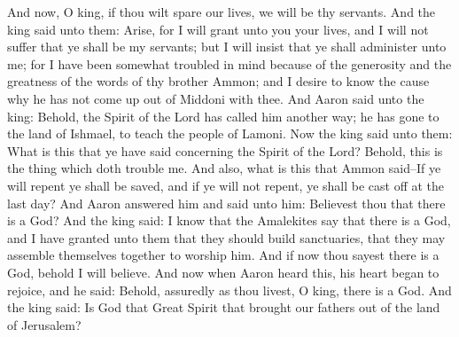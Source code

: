 And now, O king, if thou wilt spare our lives, we will be thy servants. And the king said unto them: Arise, for I will grant unto you your lives, and I will not suffer that ye shall be my servants; but I will insist that ye shall administer unto me; for I have been somewhat troubled in mind because of the generosity and the greatness of the words of thy brother Ammon; and I desire to know the cause why he has not come up out of Middoni with thee.
\bverse \iffalse And Aaron said unto the king: Behold, the Spirit of the Lord has called him another way; he has gone to the land of Ishmael, to teach the people of Lamoni. \fi
And Aaron said unto the king: Behold, the Spirit of the Lord has called him another way; he has gone to the land of Ishmael, to teach the people of Lamoni.
\bverse \iffalse Now the king said unto them: What is this that ye have said concerning the Spirit of the Lord? Behold, this is the thing which doth trouble me. \fi
Now the king said unto them: What is this that ye have said concerning the Spirit of the Lord? Behold, this is the thing which doth trouble me.
\bverse \iffalse And also, what is this that Ammon said--If ye will repent ye shall be saved, and if ye will not repent, ye shall be cast off at the last day? \fi
And also, what is this that Ammon said--If ye will repent ye shall be saved, and if ye will not repent, ye shall be cast off at the last day?
\bverse \iffalse And Aaron answered him and said unto him: Believest thou that there is a God? And the king said: I know that the Amalekites say that there is a God, and I have granted unto them that they should build sanctuaries, that they may assemble themselves together to worship him. And if now thou sayest there is a God, behold I will believe. \fi
And Aaron answered him and said unto him: Believest thou that there is a God? And the king said: I know that the Amalekites say that there is a God, and I have granted unto them that they should build sanctuaries, that they may assemble themselves together to worship him. And if now thou sayest there is a God, behold I will believe.
\bverse \iffalse And now when Aaron heard this, his heart began to rejoice, and he said: Behold, assuredly as thou livest, O king, there is a God. \fi
And now when Aaron heard this, his heart began to rejoice, and he said: Behold, assuredly as thou livest, O king, there is a God.
\bverse \iffalse And the king said: Is God that Great Spirit that brought our fathers out of the land of Jerusalem? \fi
And the king said: Is God that Great Spirit that brought our fathers out of the land of Jerusalem?
